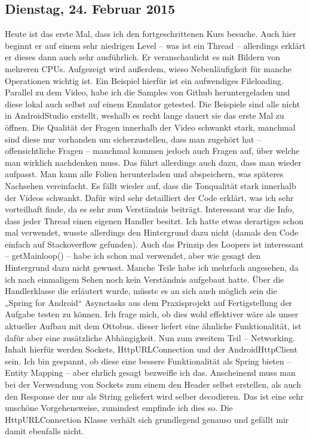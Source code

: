 \documentclass[12pt,a4paper,bibliography=totocnumbered,listof=totocnumbered]{scrartcl}
\begin{document}
\subsection{Dienstag, 24. Februar 2015}
Heute ist das erste Mal, dass ich den fortgeschrittenen Kurs besuche. Auch hier beginnt er auf einem sehr niedrigen Level – was ist ein Thread – allerdings erklärt er dieses dann auch sehr ausführlich. Er veranschaulicht es mit Bildern von mehreren CPUs. Aufgezeigt wird außerdem, wieso Nebenläufigkeit für manche Operationen wichtig ist. Ein Beispiel hierfür ist ein aufwendiges Fileloading. 
Parallel zu dem Video, habe ich die Samples von Github heruntergeladen und diese lokal auch selbst auf einem Emulator getested. Die Beispiele sind alle nicht in AndroidStudio erstellt, weshalb es recht lange dauert sie das erste Mal zu öffnen. 
Die Qualität der Fragen innerhalb der Video schwankt stark, manchmal sind diese nur vorhanden um sicherzustellen, dass man zugehört hat – offensichtliche Fragen – manchmal kommen jedoch auch Fragen auf, über welche man wirklich nachdenken muss. Das führt allerdings auch dazu, dass man wieder aufpasst. 
Man kann alle Folien herunterladen und abspeichern, was späteres Nachsehen vereinfacht.
Es fällt wieder auf, dass die Tonqualität stark innerhalb der Videos schwankt. Dafür wird sehr detailliert der Code erklärt, was ich sehr vorteilhaft finde, da es sehr zum Verständnis beiträgt. 
Interessant war die Info, dass jeder Thread einen eigenen Handler besitzt. Ich hatte etwas derartiges schon mal verwendet, wusste allerdings den Hintergrund dazu nicht (damals den Code einfach auf Stackoverflow gefunden). Auch das Prinzip des Loopers ist interessant – getMainloop() – habe ich schon mal verwendet, aber wie gesagt den Hintergrund dazu nicht gewusst. Manche Teile habe ich mehrfach angesehen, da ich nach einmaligem Sehen noch kein Verständnis aufgebaut hatte.
Über die Handlerklasse die erläutert wurde, müsste es an sich auch möglich sein die „Spring for Android“ Asynctasks aus dem Praxisprojekt auf Fertigstellung der Aufgabe testen zu können. Ich frage mich, ob dies wohl effektiver wäre als unser aktueller Aufbau mit dem Ottobus. dieser liefert eine ähnliche Funktionalität, ist dafür aber eine zusätzliche Abhängigkeit. 
Nun zum zweitem Teil – Networking. 
Inhalt hierfür werden Sockets, HttpURLConnection und der AndroidHttpClient sein. Ich bin gespannt, ob diese eine bessere Funktionalität als Spring bieten – Entity Mapping – aber ehrlich gesagt bezweifle ich das.  Anscheinend muss man bei der Verwendung von Sockets zum einem den Header selbst erstellen, als auch den Response der nur als String geliefert wird selber decodieren. Das ist eine sehr unschöne Vorgehensweise, zumindest empfinde ich dies so. Die HttpURLConnection Klasse verhält sich grundlegend genauso und gefällt mir damit ebenfalls nicht. 
\end{document}
